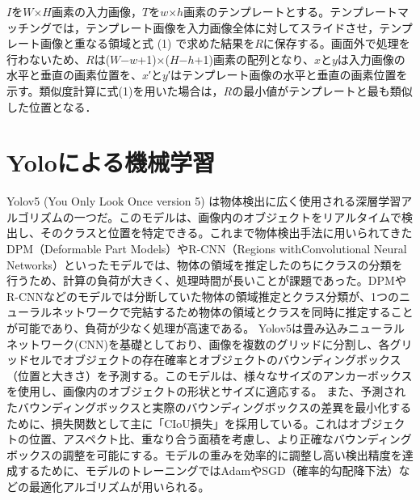 \documentclass[11pt,a4j]{jreport}
\begin{document}
$I$を$W$×$H$画素の入力画像，$T$を$w$×$h$画素のテンプレートとする。テンプレートマッチングでは，テンプレート画像を入力画像全体に対してスライドさせ，テンプレート画像と重なる領域と式 (1) で求めた結果を$R$に保存する。画面外で処理を行わないため、$R$は($W$−$w$+1)×($H$−$h$+1)画素の配列となり、$x$と$y$は入力画像の水平と垂直の画素位置を、$x$′と$y$′はテンプレート画像の水平と垂直の画素位置を示す。類似度計算に式(1)を用いた場合は，$R$の最小値がテンプレートと最も類似した位置となる．

\section{Yoloによる機械学習}
Yolov5 (You Only Look Once version 5) は物体検出に広く使用される深層学習アルゴリズムの一つだ。\cite{yolo}このモデルは、画像内のオブジェクトをリアルタイムで検出し、そのクラスと位置を特定できる。これまで物体検出手法に用いられてきたDPM（Deformable Part Models）やR-CNN（Regions withConvolutional Neural Networks）といったモデルでは、物体の領域を推定したのちにクラスの分類を行うため、計算の負荷が大きく、処理時間が長いことが課題であった。DPMやR-CNNなどのモデルでは分断していた物体の領域推定とクラス分類が、1つのニューラルネットワークで完結するため物体の領域とクラスを同時に推定することが可能であり、負荷が少なく処理が高速である。
Yolov5は畳み込みニューラルネットワーク(CNN)を基礎としており、画像を複数のグリッドに分割し、各グリッドセルでオブジェクトの存在確率とオブジェクトのバウンディングボックス（位置と大きさ）を予測する。このモデルは、様々なサイズのアンカーボックスを使用し、画像内のオブジェクトの形状とサイズに適応する。
また、予測されたバウンディングボックスと実際のバウンディングボックスの差異を最小化するために、損失関数として主に「CIoU損失」を採用している。これはオブジェクトの位置、アスペクト比、重なり合う面積を考慮し、より正確なバウンディングボックスの調整を可能にする。モデルの重みを効率的に調整し高い検出精度を達成するために、モデルのトレーニングではAdamやSGD（確率的勾配降下法）などの最適化アルゴリズムが用いられる。
\end{document}

